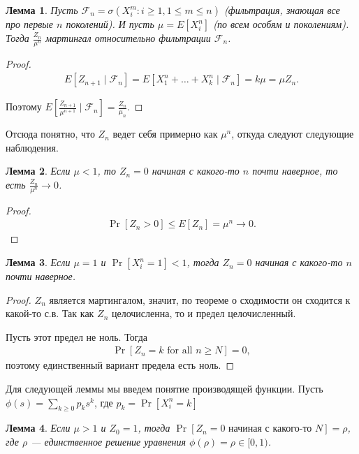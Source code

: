 \documentclass[12pt]{article}
\newcommand\F{\mathcal{F}}
\newtheorem{lemma}{Лемма}
\begin{document}
\begin{lemma}
  Пусть $\F_n = \sigma(X_i^m: i \ge 1, 1 \le m \le n)$ (фильтрация, знающая все про первые $n$ поколений). И пусть $\mu = E[X_i^n]$ (по всем особям и поколениям). Тогда $\frac{Z_n}{\mu^n}$ мартингал относительно фильтрации $\F_n$. 
\end{lemma}
\begin{proof}
  \begin{align*}
    E[Z_{n + 1} \mid \F_n] = E[X_1^n + \ldots + X_k^n \mid \F_n] = k\mu = \mu Z_n.
  \end{align*}

  Поэтому $E[\frac{Z_{n + 1}}{\mu^{n + 1}} \mid \F_n] = \frac{Z_n}{\mu_n}$.
\end{proof}

Отсюда понятно, что $Z_{n}$ ведет себя примерно как $\mu^n$, откуда следуют следующие наблюдения.

\begin{lemma}
  Если $\mu < 1$, то $Z_n = 0$ начиная с какого-то $n$ почти наверное, то есть $\frac{Z_n}{\mu^n} \to 0$.
\end{lemma}
\begin{proof}
  \begin{align*}
    \Pr[Z_n > 0] \le E[Z_n] = \mu^n \to 0.
  \end{align*}
\end{proof}

\begin{lemma}
  Если $\mu = 1$ и $\Pr[X_i^n = 1] < 1$, тогда $Z_n = 0$ начиная с какого-то $n$ почти наверное.
\end{lemma}
\begin{proof}
  $Z_n$ является мартингалом, значит, по теореме о сходимости он сходится к какой-то с.в. Так как $Z_n$ целочисленна, то и предел целочисленный.

  Пусть этот предел не ноль. Тогда 
  \begin{align*}
    \Pr[Z_n = k \text{ for all } n \ge N] = 0,
  \end{align*}
  поэтому единственный вариант предела есть ноль.
\end{proof}

Для следующей леммы мы введем понятие производящей функции. Пусть $\phi(s) = \sum_{k \ge 0} p_k s^k$, где $p_k = \Pr[X_i^n = k]$

\begin{lemma}
  Если $\mu > 1$ и $Z_0 = 1$, тогда $\Pr[Z_n = 0 \text{ начиная с какого-то }N] = \rho$, где $\rho$ --- единственное решение уравнения $\phi(\rho) = \rho \in [0, 1)$.   
\end{lemma}
\end{document}
